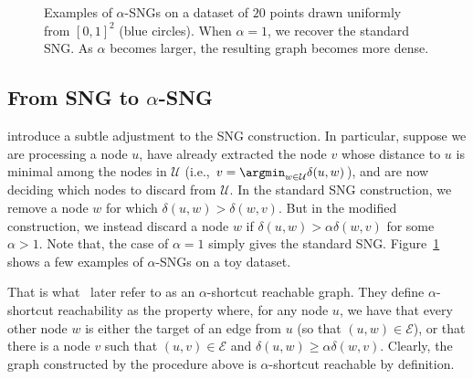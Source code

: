\begin{figure}[t]
    \caption{Examples of $\alpha$-SNGs on a dataset of $20$ points drawn uniformly
    from $[0, 1]^2$ (blue circles).
    When $\alpha=1$, we recover the standard SNG. As $\alpha$ becomes larger, the
    resulting graph becomes more dense.}
    \label{figure:graphs:sng}
\end{figure}

\subsection{From SNG to \texorpdfstring{$\alpha$}{alpha}-SNG}
\cite{diskann} introduce a subtle adjustment to the SNG construction.
In particular, suppose we are processing a node $u$, have already extracted
the node $v$ whose distance to $u$ is minimal among the nodes in $\mathcal{U}$
(i.e., $v = \argmin_{w \in \mathcal{U}} \delta(u, w)$), and are now deciding
which nodes to discard from $\mathcal{U}$. In the standard SNG construction,
we remove a node $w$ for which $\delta(u, w) > \delta(w, v)$. But in the modified
construction, we instead discard a node $w$ if $\delta(u, w) > \alpha \delta(w, v)$
for some $\alpha > 1$. Note that, the case of $\alpha = 1$ simply gives the standard SNG.
Figure~\ref{figure:graphs:sng} shows a few examples of $\alpha$-SNGs on a toy dataset.

That is what~\cite{indyk2023worstcase} later refer to as an $\alpha$-shortcut reachable
graph. They define $\alpha$-shortcut reachability as the property where,
for any node $u$, we have that every other node $w$ is either the target of an edge
from $u$ (so that $(u, w) \in \mathcal{E}$), or that there is a node $v$
such that $(u, v) \in \mathcal{E}$ and $\delta(u, w) \geq \alpha \delta(w, v)$.
Clearly, the graph constructed by the procedure above is $\alpha$-shortcut
reachable by definition.

